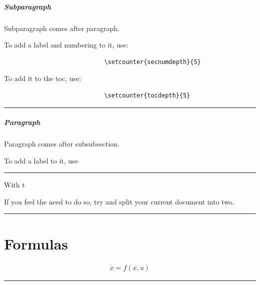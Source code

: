 \documentclass[12pt]{article}
\newcommand{\inOut}[1]{#1}                                %
\begin{document}
                \subparagraph{Subparagraph}

                    \begin{remark} \label{rem-subparagraph}
                        Subparagraph comes after paragraph.

                        To add a label and numbering to it, use:

                        \begin{lstlisting}
                            \setcounter{secnumdepth}{5}
                        \end{lstlisting}

                        To add it to the toc, use:

                        \begin{lstlisting}
                            \setcounter{tocdepth}{5}
                        \end{lstlisting}

                    \end{remark}\hrule

                    \subparagraph{Paragraph}

                    \begin{remark} \label{paragraph}
                        Paragraph comes after subsubsection.

                        To add a label to it, use \setcounter{secnumdepth}{4}
                    \end{remark}\hrule

                    \begin{remark} \label{remSec1}
                        With t

                        If you feel the need to do so, try and split your current document into two.
                    \end{remark}\hrule

\section{Formulas}\label{secForm}

    \begin{example} \label{expFor2}
        \inOut{
            \begin{equation}\begin{aligned}\label{eqFor2}
                \dot{x} = f(x,u)
            \end{aligned}\end{equation}
        }
    \end{example}\hrule
\end{document}
